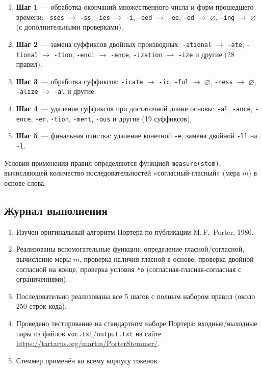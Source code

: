 \documentclass[a4paper,12pt]{article}
\begin{document}
\begin{enumerate}
    \item \textbf{Шаг 1}~--- обработка окончаний множественного числа и форм прошедшего времени: \texttt{-sses} $\to$ \texttt{-ss}, \texttt{-ies} $\to$ \texttt{-i}, \texttt{-eed} $\to$ \texttt{-ee}, \texttt{-ed} $\to$ $\varnothing$, \texttt{-ing} $\to$ $\varnothing$ (с дополнительными проверками).
    \item \textbf{Шаг 2}~--- замена суффиксов двойных производных: \texttt{-ational} $\to$ \texttt{-ate}, \texttt{-tional} $\to$ \texttt{-tion}, \texttt{-enci} $\to$ \texttt{-ence}, \texttt{-ization} $\to$ \texttt{-ize} и другие (28 правил).
    \item \textbf{Шаг 3}~--- обработка суффиксов: \texttt{-icate} $\to$ \texttt{-ic}, \texttt{-ful} $\to$ $\varnothing$, \texttt{-ness} $\to$ $\varnothing$, \texttt{-alize} $\to$ \texttt{-al} и другие.
    \item \textbf{Шаг 4}~--- удаление суффиксов при достаточной длине основы: \texttt{-al}, \texttt{-ance}, \texttt{-ence}, \texttt{-er}, \texttt{-tion}, \texttt{-ment}, \texttt{-ous} и другие (19 суффиксов).
    \item \textbf{Шаг 5}~--- финальная очистка: удаление конечной \texttt{-e}, замена двойной \texttt{-ll} на \texttt{-l}.
\end{enumerate}

Условия применения правил определяются функцией \texttt{measure(stem)}, вычисляющей количество последовательностей «согласный-гласный» (мера $m$) в основе слова.

\subsection{Журнал выполнения}

\begin{enumerate}
    \item Изучен оригинальный алгоритм Портера по публикации M.\,F.~Porter, 1980.
    \item Реализованы вспомогательные функции: определение гласной/согласной, вычисление меры $m$, проверка наличия гласной в основе, проверка двойной согласной на конце, проверка условия \texttt{*o} (согласная-гласная-согласная с ограничениями).
    \item Последовательно реализованы все 5 шагов с полным набором правил (около 250 строк кода).
    \item Проведено тестирование на стандартном наборе Портера: входные/выходные пары из файлов \texttt{voc.txt}/\texttt{output.txt} на сайте \url{https://tartarus.org/martin/PorterStemmer/}.
    \item Стеммер применён ко всему корпусу токенов.
\end{enumerate}
\end{document}
